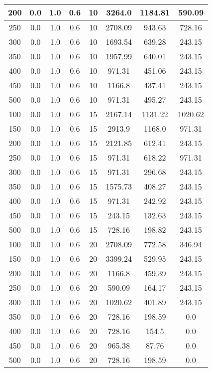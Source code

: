 \documentclass[a4paper, 12pt]{extreport}
\begin{document}
\begin{itemize}
\begin{longtable}{|c|c|c|c|c|c|c|c|}
			200 & 0.0 & 1.0 & 0.6 & 10 & 3264.0 & 1184.81 & 590.09 \\\hline
			250 & 0.0 & 1.0 & 0.6 & 10 & 2708.09 & 943.63 & 728.16 \\\hline
			300 & 0.0 & 1.0 & 0.6 & 10 & 1693.54 & 639.28 & 243.15 \\\hline
			350 & 0.0 & 1.0 & 0.6 & 10 & 1957.99 & 640.01 & 243.15 \\\hline
			400 & 0.0 & 1.0 & 0.6 & 10 & 971.31 & 451.06 & 243.15 \\\hline
			450 & 0.0 & 1.0 & 0.6 & 10 & 1166.8 & 437.41 & 243.15 \\\hline
			500 & 0.0 & 1.0 & 0.6 & 10 & 971.31 & 495.27 & 243.15 \\\hline
			100 & 0.0 & 1.0 & 0.6 & 15 & 2167.14 & 1131.22 & 1020.62 \\\hline
			150 & 0.0 & 1.0 & 0.6 & 15 & 2913.9 & 1168.0 & 971.31 \\\hline
			200 & 0.0 & 1.0 & 0.6 & 15 & 2121.85 & 612.41 & 243.15 \\\hline
			250 & 0.0 & 1.0 & 0.6 & 15 & 971.31 & 618.22 & 971.31 \\\hline
			300 & 0.0 & 1.0 & 0.6 & 15 & 971.31 & 296.68 & 243.15 \\\hline
			350 & 0.0 & 1.0 & 0.6 & 15 & 1575.73 & 408.27 & 243.15 \\\hline
			400 & 0.0 & 1.0 & 0.6 & 15 & 971.31 & 242.92 & 243.15 \\\hline
			450 & 0.0 & 1.0 & 0.6 & 15 & 243.15 & 132.63 & 243.15 \\\hline
			500 & 0.0 & 1.0 & 0.6 & 15 & 728.16 & 198.82 & 243.15 \\\hline
			100 & 0.0 & 1.0 & 0.6 & 20 & 2708.09 & 772.58 & 346.94 \\\hline
			150 & 0.0 & 1.0 & 0.6 & 20 & 3399.24 & 529.95 & 243.15 \\\hline
			200 & 0.0 & 1.0 & 0.6 & 20 & 1166.8 & 459.39 & 243.15 \\\hline
			250 & 0.0 & 1.0 & 0.6 & 20 & 590.09 & 164.17 & 243.15 \\\hline
			300 & 0.0 & 1.0 & 0.6 & 20 & 1020.62 & 401.89 & 243.15 \\\hline
			350 & 0.0 & 1.0 & 0.6 & 20 & 728.16 & 198.59 & 0.0 \\\hline
			400 & 0.0 & 1.0 & 0.6 & 20 & 728.16 & 154.5 & 0.0 \\\hline
			450 & 0.0 & 1.0 & 0.6 & 20 & 965.38 & 87.76 & 0.0 \\\hline
			500 & 0.0 & 1.0 & 0.6 & 20 & 728.16 & 198.59 & 0.0 \\\hline

\end{longtable}
\end{itemize}
\end{document}
